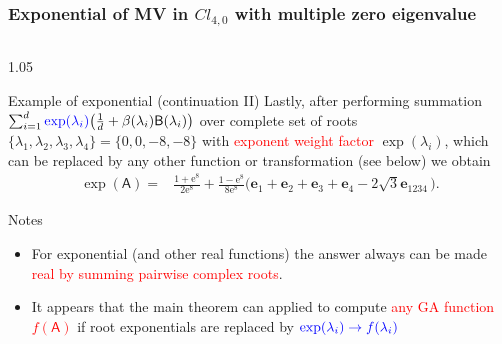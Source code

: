 \documentclass[xcolor=table,hyperref={pdfpagemode=FullScreen}]{beamer}
\newcommand{\ee}{\mathrm{e}} %
\newcommand{\cl}[2]{\ensuremath{\mathit{Cl}_{#1,#2}}} %
\newcommand{\e}[1]{\mathbf{e}_{#1}} %
\def\m#1{\mathsf{#1}} %
\def\m#1{\mathsf{#1}}%
\newcommand{\red}[1]{\textcolor{red}{#1}}
\newcommand{\blue}[1]{\textcolor{blue}{#1}}
\begin{document}
\begin{frame}
\frametitle<presentation>{Exponential of MV in \cl{4}{0} with multiple zero eigenvalue}
\vskip -10pt
\begin{columns}[t]
\begin{column}{1.05\textwidth}
  \begin{block}{Example of exponential (continuation II)}
 Lastly,
after performing summation $\sum_{i=1}^{d}
    \blue{\exp(\lambda_i)}\bigl(\frac{1}{d}+\beta(\lambda_i)\m{B}(\lambda_i)\bigr)$
over complete set of roots
$\{\lambda_1,\lambda_2,\lambda_3,\lambda_4\}=\{0,0,-8,-8\}$ with
    \red{exponent weight factor} $\exp(\lambda_i)$, which can be replaced by
any other function or transformation (see
below) we obtain
\abovedisplayskip=5pt
\belowdisplayskip=5pt
\begin{align*}
  \exp(\m{A})= & \frac{1+\ee^8}{2 \ee^8}+
\frac{1-\ee^8}{8 \ee^8}\big(\e{1}+ \e{2}+\e{3}+
   \e{4}-2\sqrt{3}\e{1234}\,\big).
\end{align*}
\end{block}
\begin{block}{Notes}
\begin{itemize}
  \item For exponential (and other real functions) the answer always can be made \red{real by summing pairwise complex roots}.
  \item It appears that the main theorem can applied to compute \red{any GA function $f(\m{A})$}  if root exponentials are replaced by $\blue{\exp(\lambda_i)\to f(\lambda_i)}$
\end{itemize}
\end{block}\end{column}
\end{columns}
\end{frame}
\end{document}
